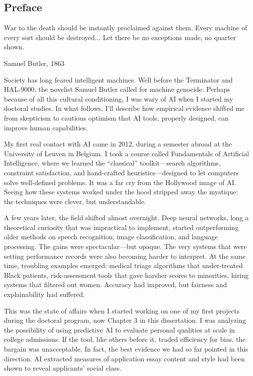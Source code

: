 \documentclass[11pt]{report}
\begin{document}
\begin{mainf} %

\chapter{Preface}


 \epigraph{War to the death should be instantly proclaimed against them. Every machine of every sort should be destroyed... 
 Let there be no exceptions made, no quarter shown.}{Samuel Butler, 1863
    }

Society has long feared intelligent machines. 
Well before the Terminator and HAL-9000, the novelist Samuel Butler called for machine genocide. 
Perhaps because of all this cultural conditioning, I was wary of AI when I started my doctoral studies. 
In what follows, I'll describe how empirical evidence shifted me from skepticism to cautious optimism that AI tools, properly designed, can improve human capabilities.

My first real contact with AI came in 2012, during a semester abroad at the University of Leuven in Belgium. 
I took a course called Fundamentals of Artificial Intelligence, where we learned the “classical” toolkit—search algorithms, constraint satisfaction, and hand-crafted heuristics—designed to let computers solve well-defined problems. 
It was a far cry from the Hollywood image of AI. 
Seeing how these systems worked under the hood stripped away the mystique: the techniques were clever, but understandable.

A few years later, the field shifted almost overnight. 
Deep neural networks, long a theoretical curiosity that was impractical to implement, started outperforming older methods on speech recognition, image classification, and language processing. 
The gains were spectacular—but opaque. 
The very systems that were setting performance records were also becoming harder to interpret. 
At the same time, troubling examples emerged: medical triage algorithms that under-treated Black patients, risk-assessment tools that gave harsher scores to minorities, hiring systems that filtered out women. 
Accuracy had improved, but fairness and explainability had suffered.

This was the state of affairs when I started working on one of my first projects during the doctoral program, now Chapter 3 in this dissertation. 
I was analyzing the possibility of using predictive AI to evaluate personal qualities at scale in college admissions. 
If the tool, like others before it, traded efficiency for bias, the bargain was unacceptable. 
In fact, the best evidence we had so far pointed in this direction. 
AI extracted measures of application essay content and style had been shown to reveal applicants’ social class.


\end{mainf}
\end{document}
